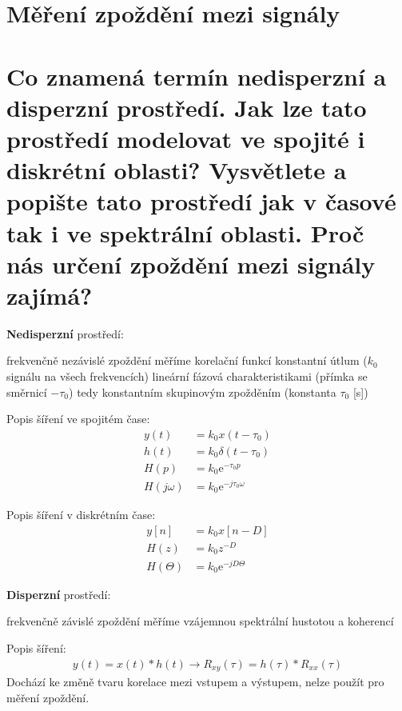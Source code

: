 \documentclass[a4paper,12pt]{article}   %
\newcommand{\mt}[1]{$#1$}
\newcommand{\e}{\text{e}}
\begin{document}
\clearpage

\section*{Měření zpoždění mezi signály} 
\section{Co znamená termín nedisperzní a disperzní prostředí. Jak lze tato prostředí modelovat ve spojité i diskrétní oblasti? Vysvětlete a popište tato prostředí jak v časové tak i ve spektrální oblasti. Proč nás určení zpoždění mezi signály zajímá?}\label{sec:zpozdeni:uvod}


\textbf{Nedisperzní} prostředí:
\begin{outline}
        \1 frekvenčně nezávislé
        \1 zpoždění měříme korelační funkcí
        \1 konstantní útlum (\mt{k_0} signálu na všech frekvencích)
        \1 lineární fázová charakteristikami (přímka se směrnicí \mt{-\tau_0})
        \2 tedy konstantním skupinovým zpožděním (konstanta \mt{\tau_0} [s])
\end{outline}

Popis šíření ve spojitém čase:\\
\begin{align*}
        y(t) &= k_0 x (t-\tau_0)\\
        h(t) &= k_0\delta(t-\tau_0)\\
        H(p) &= k_0\e^{-\tau_0 p}\\
        H(j\omega) &= k_0\e^{-j\tau_0\omega}
\end{align*}

Popis šíření v diskrétním čase:
\begin{align*}
        y[n] &= k_0 x[n-D]\\
        H(z) &= k_0z^{-D}\\
        H(\Theta) &= k_0\e^{-jD\Theta}
\end{align*} 


\textbf{Disperzní} prostředí:
\begin{outline}
        \1 frekvenčně závislé
        \1 zpoždění měříme vzájemnou spektrální hustotou a koherencí
\end{outline}

Popis šíření:
\begin{align*}
        y(t) = x(t)\ast h(t)\rightarrow R_{xy}(\tau) = h(\tau)\ast R_{xx}(\tau)
\end{align*}
Dochází ke změně tvaru korelace mezi vstupem a výstupem, nelze použít pro měření zpoždění. 
\end{document}
